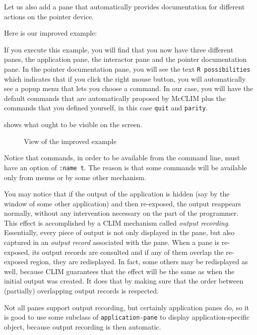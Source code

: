 Let us also add a pane that automatically provides documentation for
different actions on the pointer device.

Here is our improved example:



If you execute this example, you will find that you now have three
different panes, the application pane, the interactor pane and the
pointer documentation pane.  In the pointer documentation pane, you will
see the text \texttt{R possibilities} which indicates that if you click the
right mouse button, you will automatically see a popup menu that lets
you choose a command.  In our case, you will have the default commands
that are automatically proposed by McCLIM plus the commands that you
defined yourself, in this case \texttt{quit} and \texttt{parity}.

 shows what ought to be visible on the screen.

\begin{figure}
\begin{center}
\end{center}
\caption{\label{fig-ex2} View of the improved example}
\end{figure}

Notice that commands, in order to be available from the command line,
must have an option of \texttt{:name t}.  The reason is that some commands
will be available only from menus or by some other mechanism.

You may notice that if the output of the application is hidden (say by
the window of some other application) and then re-exposed, the output
reappears normally, without any intervention necessary on the part of
the programmer.  This effect is accomplished by a CLIM mechanism called
\emph{output recording}.
Essentially, every piece of output is not only displayed in the pane,
but also captured in an \emph{output record} associated with the pane.
When a pane is re-exposed, its output records are consulted and if any
of them overlap the re-exposed region, they are redisplayed.  In fact,
some others may be redisplayed as well, because CLIM guarantees that the
effect will be the same as when the initial output was created.  It does
that by making sure that the order between (partially) overlapping
output records is respected.

Not all panes support output recording, but certainly application panes
do, so it is good to use some subclass of \texttt{application-pane} to
display application-specific object, because output recording is then
automatic.

